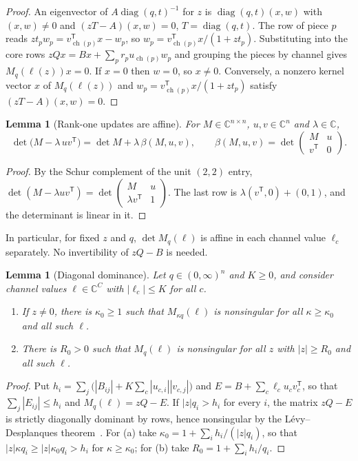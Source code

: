 \documentclass[11pt,a4paper]{article}
\theoremstyle{plain}
\newtheorem{lemma}[theorem]{Lemma}
\theoremstyle{definition}
\theoremstyle{remark}
\newcommand{\C}{\mathbb{C}}
\newcommand{\diag}{\operatorname{diag}}
\newcommand{\ch}{\operatorname{ch}}
\newcommand{\T}{\mathsf{T}}
\begin{document}
\begin{proof}
An eigenvector of $A\diag(q,t)^{-1}$ for $z$ is $\diag(q,t)(x,w)$ with $(x,w)\ne0$ and
$(zT-A)(x,w)=0$, $T=\diag(q,t)$. The row of piece $p$ reads $zt_pw_p=v_{\ch(p)}^\T x-w_p$,
so $w_p=v_{\ch(p)}^\T x/(1+zt_p)$. Substituting into the core rows
$zQx=Bx+\sum_pr_pu_{\ch(p)}w_p$ and grouping the pieces by channel gives $M_q(\ell(z))x=0$.
If $x=0$ then $w=0$, so $x\ne0$. Conversely, a nonzero kernel vector $x$ of
$M_q(\ell(z))$ and $w_p=v_{\ch(p)}^\T x/(1+zt_p)$ satisfy $(zT-A)(x,w)=0$.
\end{proof}

\begin{lemma}[Rank-one updates are affine]\label{lem:affine}
For $M\in\C^{n\times n}$, $u,v\in\C^n$ and $\lambda\in\C$,
\[
  \det\bigl(M-\lambda\,uv^\T\bigr)=\det M+\lambda\,\beta(M,u,v),\qquad
  \beta(M,u,v)=\det\begin{pmatrix}M&u\\ v^\T&0\end{pmatrix}.
\]
\end{lemma}

\begin{proof}
By the Schur complement of the unit $(2,2)$ entry,
$\det(M-\lambda uv^\T)=\det\begin{pmatrix}M&u\\ \lambda v^\T&1\end{pmatrix}$. The last row
is $\lambda(v^\T,0)+(0,1)$, and the determinant is linear in it.
\end{proof}

In particular, for fixed $z$ and $q$, $\det M_q(\ell)$ is affine in each channel value
$\ell_c$ separately. No invertibility of $zQ-B$ is needed.

\begin{lemma}[Diagonal dominance]\label{lem:dilation}
Let $q\in(0,\infty)^n$ and $K\ge0$, and consider channel values $\ell\in\C^C$ with
$|\ell_c|\le K$ for all $c$.
\begin{enumerate}[label=(\alph*)]
  \item If $z\ne0$, there is $\kappa_0\ge1$ such that $M_{\kappa q}(\ell)$ is nonsingular for
    all $\kappa\ge\kappa_0$ and all such $\ell$.
  \item There is $R_0>0$ such that $M_q(\ell)$ is nonsingular for all $z$ with $|z|\ge R_0$
    and all such $\ell$.
\end{enumerate}
\end{lemma}

\begin{proof}
Put $h_i=\sum_j\bigl(|B_{ij}|+K\sum_c|u_{c,i}||v_{c,j}|\bigr)$ and
$E=B+\sum_c\ell_cu_cv_c^\T$, so that $\sum_j|E_{ij}|\le h_i$ and $M_q(\ell)=zQ-E$. If
$|z|q_i>h_i$ for every $i$, the matrix $zQ-E$ is strictly diagonally dominant by rows, hence
nonsingular by the Lévy--Desplanques theorem~\cite{taussky1949}. For (a) take
$\kappa_0=1+\sum_ih_i/(|z|q_i)$, so that $|z|\kappa q_i\ge|z|\kappa_0q_i>h_i$ for
$\kappa\ge\kappa_0$; for (b) take $R_0=1+\sum_ih_i/q_i$.
\end{proof}
\end{document}
